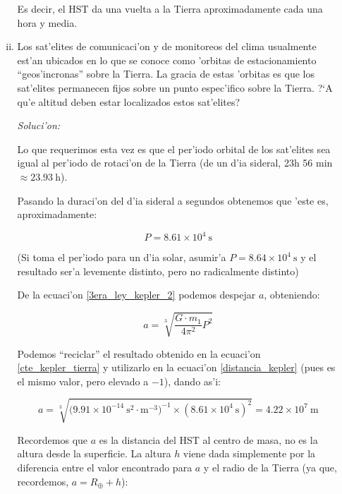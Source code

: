 \documentclass{article}
\newenvironment{myfont}{\fontfamily{pnc}\selectfont}{\par}
\begin{document}
\begin{enumerate}[a)]
\begin{enumerate}[i)]
Es decir, el HST da una vuelta a la Tierra aproximadamente cada una hora y media.

\begin{myfont}
\item Los sat'elites de comunicaci'on y de monitoreos del clima usualmente est'an ubicados en lo que se conoce como 'orbitas de estacionamiento ``geos'incronas'' sobre la Tierra. La gracia de estas 'orbitas es que los sat'elites permanecen fijos sobre un punto espec'ifico sobre la Tierra. ?`A qu'e altitud deben estar localizados estos sat'elites?\end{myfont}

\emph{Soluci'on:}

Lo que requerimos esta vez es que el per'iodo orbital de los sat'elites sea igual al per'iodo de rotaci'on de la Tierra (de un d'ia sideral, 23h 56 min $\approx 23.93 \ \text{h}$).

Pasando la duraci'on del d'ia sideral a segundos obtenemos que 'este es, aproximadamente:

\begin{equation*}
P = 8.61 \times 10^4 \ \text{s}
\end{equation*}

(Si toma el per'iodo para un d'ia solar, asumir'a $P = 8.64 \times 10^4 \ \text{s}$ y el resultado ser'a levemente distinto, pero no radicalmente distinto)

De la ecuaci'on \eqref{3era_ley_kepler_2} podemos despejar $a$, obteniendo:

\begin{equation} \label{distancia_kepler}
a = \sqrt[3]{\frac{G \cdot m_1}{4 \pi^2} P^2}
\end{equation}

Podemos ``reciclar'' el resultado obtenido en la ecuaci'on \eqref{cte_kepler_tierra} y utilizarlo en la ecuaci'on \eqref{distancia_kepler} (pues es el mismo valor, pero elevado a $-1$), dando as'i:

\begin{equation*}
a = \sqrt[3]{\big( 9.91 \times 10^{-14} \ \text{s}^2 \cdot \text{m}^{-3} \big) ^{-1} \times (8.61 \times 10^4 \ \text{s})^2} = 4.22 \times 10^{7} \ \text{m}
\end{equation*}

Recordemos que $a$ es la distancia del HST al centro de masa, no es la altura desde la superficie. La altura $h$ viene dada simplemente por la diferencia entre el valor encontrado para $a$ y el radio de la Tierra (ya que, recordemos, $a = R_\oplus + h$):


\end{enumerate}
\end{enumerate}
\end{document}
